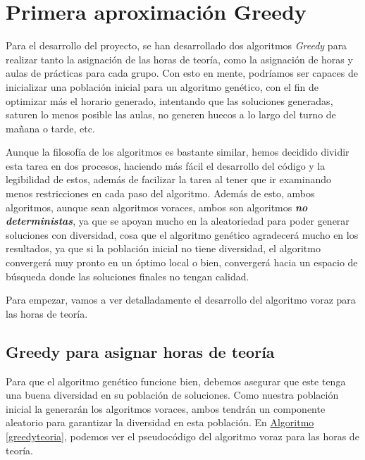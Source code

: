\chapter{Primera aproximación Greedy}
Para el desarrollo del proyecto, se han desarrollado dos algoritmos \textit{Greedy} para realizar tanto la asignación de las horas de teoría, como la asignación de horas y aulas de prácticas para cada grupo. Con esto en mente, podríamos ser capaces de inicializar una población inicial para un algoritmo genético, con el fin de optimizar más el horario generado, intentando que las soluciones generadas, saturen lo menos posible las aulas, no generen huecos a lo largo del turno de mañana o tarde, etc. 

Aunque la filosofía de los algoritmos es bastante similar, hemos decidido dividir esta tarea en dos procesos, haciendo más fácil el desarrollo del código y la legibilidad de estos, además de facilizar la tarea al tener que ir examinando menos restricciones en cada paso del algoritmo. Además de esto, ambos algoritmos, aunque sean algoritmos voraces, ambos son algoritmos \textbf{\textit{no deterministas}}, ya que se apoyan mucho en la aleatoriedad para poder generar soluciones con diversidad, cosa que el algoritmo genético agradecerá mucho en los resultados, ya que si la población inicial no tiene diversidad, el algoritmo convergerá muy pronto en un óptimo local o bien, convergerá hacia un espacio de búsqueda donde las soluciones finales no tengan calidad.

Para empezar, vamos a ver detalladamente el desarrollo del algoritmo voraz para las horas de teoría.

\section{Greedy para asignar horas de teoría}

Para que el algoritmo genético funcione bien, debemos asegurar que este tenga una buena diversidad en su población de soluciones. Como nuestra población inicial la generarán los algoritmos voraces, ambos tendrán un componente aleatorio para garantizar la diversidad en esta población. En \hyperref[greedyteoria]{Algoritmo \ref*{greedyteoria}}, podemos ver el pseudocódigo del algoritmo voraz para las horas de teoría.

